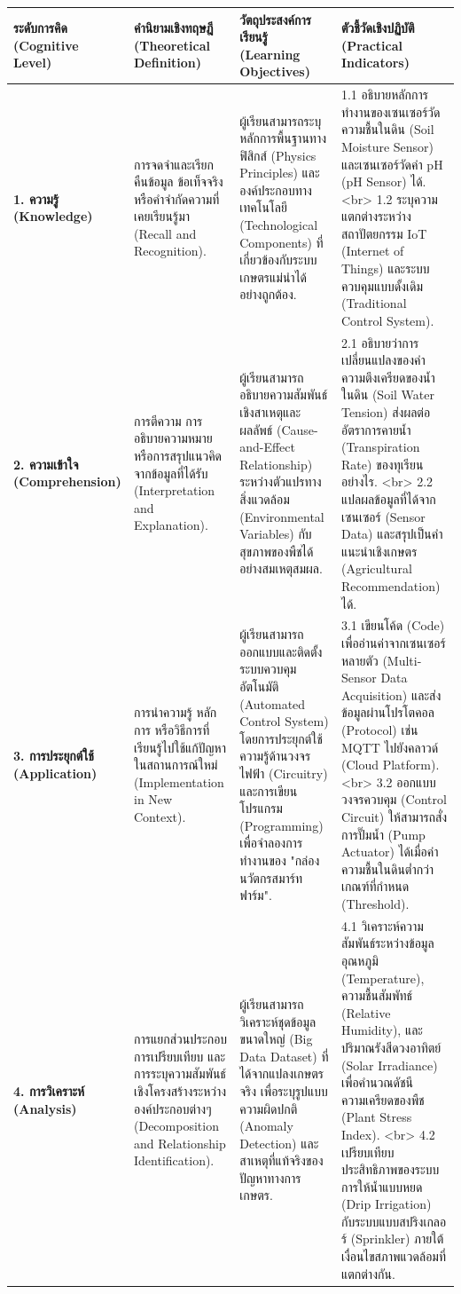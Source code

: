 \documentclass[11pt,a4paper,openany]{report}
\begin{document}
\begin{table}[htbp]
\centering
\begin{tabularx}{\textwidth}{L L L L}
\toprule
ระดับการคิด (Cognitive Level) & คำนิยามเชิงทฤษฎี (Theoretical Definition) & วัตถุประสงค์การเรียนรู้ (Learning Objectives) & ตัวชี้วัดเชิงปฏิบัติ (Practical Indicators) \\
\midrule
\textbf{1. ความรู้ (Knowledge)} & การจดจำและเรียกคืนข้อมูล ข้อเท็จจริง หรือคำจำกัดความที่เคยเรียนรู้มา (Recall and Recognition). & ผู้เรียนสามารถระบุหลักการพื้นฐานทางฟิสิกส์ (Physics Principles) และองค์ประกอบทางเทคโนโลยี (Technological Components) ที่เกี่ยวข้องกับระบบเกษตรแม่นำได้อย่างถูกต้อง. & 1.1 อธิบายหลักการทำงานของเซนเซอร์วัดความชื้นในดิน (Soil Moisture Sensor) และเซนเซอร์วัดค่า pH (pH Sensor) ได้. <br> 1.2 ระบุความแตกต่างระหว่างสถาปัตยกรรม IoT (Internet of Things) และระบบควบคุมแบบดั้งเดิม (Traditional Control System). \\
\textbf{2. ความเข้าใจ (Comprehension)} & การตีความ การอธิบายความหมาย หรือการสรุปแนวคิดจากข้อมูลที่ได้รับ (Interpretation and Explanation). & ผู้เรียนสามารถอธิบายความสัมพันธ์เชิงสาเหตุและผลลัพธ์ (Cause-and-Effect Relationship) ระหว่างตัวแปรทางสิ่งแวดล้อม (Environmental Variables) กับสุขภาพของพืชได้อย่างสมเหตุสมผล. & 2.1 อธิบายว่าการเปลี่ยนแปลงของค่าความตึงเครียดของน้ำในดิน (Soil Water Tension) ส่งผลต่ออัตราการคายน้ำ (Transpiration Rate) ของทุเรียนอย่างไร. <br> 2.2 แปลผลข้อมูลที่ได้จากเซนเซอร์ (Sensor Data) และสรุปเป็นคำแนะนำเชิงเกษตร (Agricultural Recommendation) ได้. \\
\textbf{3. การประยุกต์ใช้ (Application)} & การนำความรู้ หลักการ หรือวิธีการที่เรียนรู้ไปใช้แก้ปัญหาในสถานการณ์ใหม่ (Implementation in New Context). & ผู้เรียนสามารถออกแบบและติดตั้งระบบควบคุมอัตโนมัติ (Automated Control System) โดยการประยุกต์ใช้ความรู้ด้านวงจรไฟฟ้า (Circuitry) และการเขียนโปรแกรม (Programming) เพื่อจำลองการทำงานของ "กล่องนวัตกรสมาร์ทฟาร์ม". & 3.1 เขียนโค้ด (Code) เพื่ออ่านค่าจากเซนเซอร์หลายตัว (Multi-Sensor Data Acquisition) และส่งข้อมูลผ่านโปรโตคอล (Protocol) เช่น MQTT ไปยังคลาวด์ (Cloud Platform). <br> 3.2 ออกแบบวงจรควบคุม (Control Circuit) ให้สามารถสั่งการปั๊มน้ำ (Pump Actuator) ได้เมื่อค่าความชื้นในดินต่ำกว่าเกณฑ์ที่กำหนด (Threshold). \\
\textbf{4. การวิเคราะห์ (Analysis)} & การแยกส่วนประกอบ การเปรียบเทียบ และการระบุความสัมพันธ์เชิงโครงสร้างระหว่างองค์ประกอบต่างๆ (Decomposition and Relationship Identification). & ผู้เรียนสามารถวิเคราะห์ชุดข้อมูลขนาดใหญ่ (Big Data Dataset) ที่ได้จากแปลงเกษตรจริง เพื่อระบุรูปแบบความผิดปกติ (Anomaly Detection) และสาเหตุที่แท้จริงของปัญหาทางการเกษตร. & 4.1 วิเคราะห์ความสัมพันธ์ระหว่างข้อมูลอุณหภูมิ (Temperature), ความชื้นสัมพัทธ์ (Relative Humidity), และปริมาณรังสีดวงอาทิตย์ (Solar Irradiance) เพื่อคำนวณดัชนีความเครียดของพืช (Plant Stress Index). <br> 4.2 เปรียบเทียบประสิทธิภาพของระบบการให้น้ำแบบหยด (Drip Irrigation) กับระบบแบบสปริงเกลอร์ (Sprinkler) ภายใต้เงื่อนไขสภาพแวดล้อมที่แตกต่างกัน. \\

\end{tabularx}
\end{table}
\end{document}
